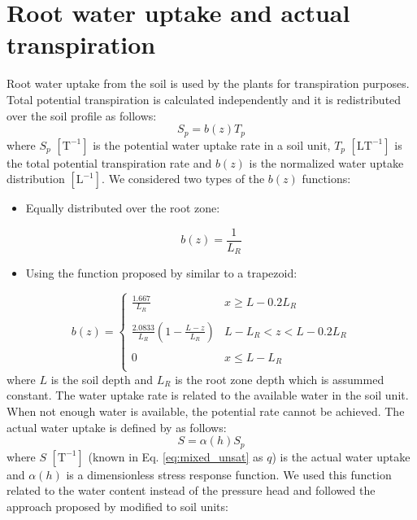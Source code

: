 \documentclass[a4paper,12pt]{article}
\begin{document}
\section{Root water uptake and actual transpiration}
Root water uptake from the soil is used by the plants for transpiration purposes. Total potential transpiration is calculated independently and it is redistributed over the soil profile as follows: 
\begin{equation} \label{eq:rwu_root_dist}
    S_p=b(z)T_p
\end{equation}
where $S_p$ $\mathrm{[T^{-1}]}$ is the potential water uptake rate in a soil unit, $T_p$ $\mathrm{[LT^{-1}]}$ is the total potential transpiration rate and $b(z)$ is the normalized water uptake distribution $\mathrm{[L^{-1}]}$. We considered two types of the $b(z)$ functions:
\begin{itemize}
\item Equally distributed over the root zone:
\end{itemize}
\begin{equation} \label{eq:rwu_bz_1}
    b(z)=\frac{1}{L_R}
\end{equation}
\begin{itemize}
\item Using the function proposed by \cite{Hoffman1983} similar to a trapezoid:
\end{itemize}
\begin{equation} \label{eq:rwu_bz_2}
  b(z)=%
  \begin{cases}
    \frac{1.667}{L_R} & x\geq L-0.2L_R \\
    \\
    \frac{2.0833}{L_R}(1-\frac{L-z}{L_R}) & L-L_R<z<L-0.2L_R \\
    \\
  	0 & x\leq L-L_R \\
  \end{cases}
\end{equation}
where $L$ is the soil depth and $L_R$ is the root zone depth which is assummed constant. 
The water uptake rate is related to the available water in the soil unit. When not enough water is available, the potential rate cannot be achieved. The actual water uptake is defined by \cite{Feddes1978} as follows:
 \begin{equation} \label{eq:rwu_root_stress}
    S=\alpha(h)S_p
\end{equation}
where $S$ $\mathrm{[T^{-1}]}$ (known in Eq. \ref{eq:mixed_unsat} as $q$) is the actual water uptake and $\alpha(h)$ is a dimensionless stress response function. We used this function related to the water content instead of the pressure head and followed the approach proposed by \cite{FAO1998} modified to soil units:
\end{document}
